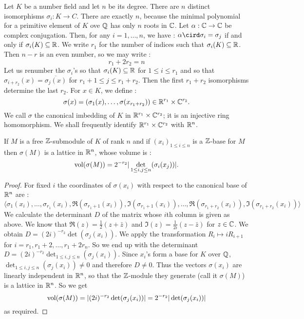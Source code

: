 \begin{definition}
  Let $K$ be a number field and let $n$ be its degree. There are $n$ distinct isomorphisms $\sigma_i : K \to C$. There are exactly $n$, because the minimal polynomial for a primitive element of $K$ ove $\mathbb{Q}$ has only $n$ roots in $\mathbb{C}$. Let $\alpha : \mathbb{C} \to \mathbb{C}$ be complex conjugation. Then, for any $i = 1, \ldots, n$, we have : $\alpha \cird \sigma_i = \sigma_j$ if and only if $\sigma_i(K)\subseteq \mathbb{R}$. We write $r_1$ for the number of indices such that
  $\sigma_i(K)\subseteq \mathbb{R}$. Then $n-r$ is an even number, so we may write :
  \[r_1 + 2 r_2 = n\]
  Let us renumber the $\sigma_i$'s so that $\sigma_i(K)\subseteq \mathbb{R}$ for $1\leq i\leq r_1$ and so that $\sigma_{i+r_2}(x)=\overline{\sigma_j(x)}$ for $r_1 + 1 \leq j \leq r_1 + r_2$. Then the first $r_1+r_2$ isomorphisms determine the last $r_2$. For $x\in K$, we define :
  \[\sigma(x)=(\sigma_1(x), \ldots, \sigma(x_{r_1+r_2}))\in \mathbb{R}^{r_1}\times \mathbb{C}^{r_2}.\]
  We call $\sigma$ the canonical imbedding of $K$ in $\mathbb{R}^{r_1}\times \mathbb{C}^{r_2}$; it is an injective ring homomorphism. We shall frequently identify $\mathbb{R}^{r_1}\times \mathbb{C}^{r_2}$ with $\mathbb{R}^{n}$.
\end{definition}

\begin{prop}
  If $M$ is a free $\mathbb{Z}$-submodule of $K$ of rank $n$ and if $(x_i)_{1\leq i\leq n}$ is a $\mathbb{Z}$-base for $M$ then $\sigma(M)$ is a lattice in $\mathbb{R}^n$, whose volume is :
  \[\operatorname{vol}(\sigma(M)) = 2^{-r_2}|\det_{1\leq i,j\leq n}(\sigma_i(x_j))|.\]
\end{prop}

\begin{proof}
  For fixed $i$ the coordinates of $\sigma(x_i)$ with respect to the canonical base of $\mathbb{R}^n$ are :
  \small{\[\langle\sigma_1(x_i),\ldots,\sigma_{r_1}(x_i), \Re(\sigma_{r_1+1}(x_i)), \Im(\sigma_{r_1+1}(x_i)),\ldots, \Re(\sigma_{r_1+r_2}(x_i)), \Im(\sigma_{r_1+r_2}(x_i))\rangle\]}
  We calculate the determinant $D$ of the matrix whose $i$th column is given as above. We know that $\Re(z) = \frac12(z+\bar{z})$ and $\Im(z)=\frac{1}{2i}(z-\bar{z})$ for $z\in \mathbb{C}$. We obtain $D = (2i)^{-r_2}\det(\sigma_j(x_i))$. We apply the transformation $R_{i}\mapsto iR_{i+1}$ for $i=r_1, r_1+2,\ldots, r_1+2r_n$.
   So we end up with the determinant $D = (2i)^{-r_2}\det_{1\leq i,j\leq n}(\sigma_j(x_i))$. Since $x_i$'s form a base for $K$ over $\mathbb{Q}$, $\det_{1\leq i,j\leq n}(\sigma_j(x_i))\neq 0$ and therefore $D\neq 0$. Thus the vectors $\sigma(x_i)$ are linearly independent in $\mathbb{R}^n$, so that the $\mathbb{Z}$-module they generate (call it $\sigma(M)$) is a lattice in $\mathbb{R}^n$. So we get
   \[\operatorname{vol}(\sigma(M)) = |(2i)^{-r_2}\det(\sigma_j(x_i))| = 2^{-r_2}|\det(\sigma_j(x_i))|\]
   as required.
\end{proof}


